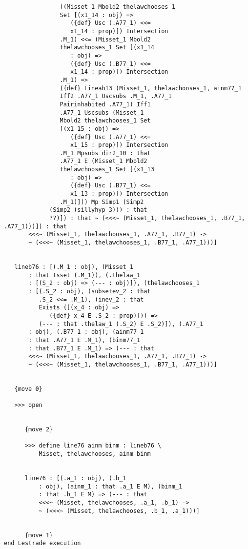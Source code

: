 \documentclass[12pt]{article}
\begin{document}
\begin{verbatim}
                ((Misset_1 Mbold2 thelawchooses_1 
                Set [(x1_14 : obj) => 
                   ({def} Usc (.A77_1) <<= 
                   x1_14 : prop)]) Intersection 
                .M_1) <<= (Misset_1 Mbold2 
                thelawchooses_1 Set [(x1_14 
                   : obj) => 
                   ({def} Usc (.B77_1) <<= 
                   x1_14 : prop)]) Intersection 
                .M_1) => 
                ({def} Lineab13 (Misset_1, thelawchooses_1, ainm77_1 
                Iff2 .A77_1 Uscsubs .M_1, .A77_1 
                Pairinhabited .A77_1) Iff1 
                .A77_1 Uscsubs (Misset_1 
                Mbold2 thelawchooses_1 Set 
                [(x1_15 : obj) => 
                   ({def} Usc (.A77_1) <<= 
                   x1_15 : prop)]) Intersection 
                .M_1 Mpsubs dir2_10 : that 
                .A77_1 E (Misset_1 Mbold2 
                thelawchooses_1 Set [(x1_13 
                   : obj) => 
                   ({def} Usc (.B77_1) <<= 
                   x1_13 : prop)]) Intersection 
                .M_1)])) Mp Simp1 (Simp2 
             (Simp2 (sillyhyp_3))) : that 
             ??)]) : that ~ (<<<~ (Misset_1, thelawchooses_1, .B77_1, .A77_1)))]) : that 
       <<<~ (Misset_1, thelawchooses_1, .A77_1, .B77_1) -> 
       ~ (<<<~ (Misset_1, thelawchooses_1, .B77_1, .A77_1)))]


   lineb76 : [(.M_1 : obj), (Misset_1 
       : that Isset (.M_1)), (.thelaw_1 
       : [(S_2 : obj) => (--- : obj)]), (thelawchooses_1 
       : [(.S_2 : obj), (subsetev_2 : that 
          .S_2 <<= .M_1), (inev_2 : that 
          Exists ([(x_4 : obj) => 
             ({def} x_4 E .S_2 : prop)])) => 
          (--- : that .thelaw_1 (.S_2) E .S_2)]), (.A77_1 
       : obj), (.B77_1 : obj), (ainm77_1 
       : that .A77_1 E .M_1), (binm77_1 
       : that .B77_1 E .M_1) => (--- : that 
       <<<~ (Misset_1, thelawchooses_1, .A77_1, .B77_1) -> 
       ~ (<<<~ (Misset_1, thelawchooses_1, .B77_1, .A77_1)))]


   {move 0}

   >>> open


      {move 2}

      >>> define line76 ainm binm : lineb76 \
          Misset, thelawchooses, ainm binm


      line76 : [(.a_1 : obj), (.b_1 
          : obj), (ainm_1 : that .a_1 E M), (binm_1 
          : that .b_1 E M) => (--- : that 
          <<<~ (Misset, thelawchooses, .a_1, .b_1) -> 
          ~ (<<<~ (Misset, thelawchooses, .b_1, .a_1)))]


      {move 1}
end Lestrade execution
\end{verbatim}
\end{document}
